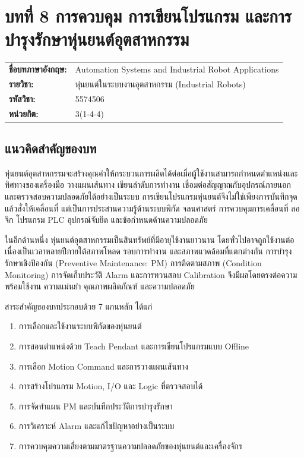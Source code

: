 \section{บทที่ 8 การควบคุม การเขียนโปรแกรม และการบำรุงรักษาหุ่นยนต์อุตสาหกรรม}

\begin{tabularx}{\textwidth}{@{}L{0.24\textwidth}Y@{}}
\textbf{ชื่อบทภาษาอังกฤษ:} & Automation Systems and Industrial Robot Applications \\
\textbf{รายวิชา:} & หุ่นยนต์ในระบบงานอุตสาหกรรม (Industrial Robots) \\
\textbf{รหัสวิชา:} & 5574506 \\
\textbf{หน่วยกิต:} & 3(1-4-4) \\
\end{tabularx}


\subsection{แนวคิดสำคัญของบท}

หุ่นยนต์อุตสาหกรรมจะสร้างคุณค่าให้กระบวนการผลิตได้ต่อเมื่อผู้ใช้งานสามารถกำหนดตำแหน่งและทิศทางของเครื่องมือ วางแผนเส้นทาง เขียนลำดับการทำงาน เชื่อมต่อสัญญาณกับอุปกรณ์ภายนอก และตรวจสอบความปลอดภัยได้อย่างเป็นระบบ การเขียนโปรแกรมหุ่นยนต์จึงไม่ใช่เพียงการบันทึกจุดแล้วสั่งให้เคลื่อนที่ แต่เป็นการประสานความรู้ด้านระบบพิกัด จลนศาสตร์ การควบคุมการเคลื่อนที่ ลอจิก โปรแกรม PLC อุปกรณ์จับยึด และข้อกำหนดด้านความปลอดภัย

ในอีกด้านหนึ่ง หุ่นยนต์อุตสาหกรรมเป็นสินทรัพย์ที่มีอายุใช้งานยาวนาน โดยทั่วไปอาจถูกใช้งานต่อเนื่องเป็นเวลาหลายปีภายใต้สภาพโหลด รอบการทำงาน และสภาพแวดล้อมที่แตกต่างกัน การบำรุงรักษาเชิงป้องกัน (Preventive Maintenance: PM) การติดตามสภาพ (Condition Monitoring) การจัดเก็บประวัติ Alarm และการทวนสอบ Calibration จึงมีผลโดยตรงต่อความพร้อมใช้งาน ความแม่นยำ คุณภาพผลิตภัณฑ์ และความปลอดภัย

สาระสำคัญของบทประกอบด้วย 7 แกนหลัก ได้แก่

\begin{enumerate}
    \item การเลือกและใช้งานระบบพิกัดของหุ่นยนต์
    \item การสอนตำแหน่งด้วย Teach Pendant และการเขียนโปรแกรมแบบ Offline
    \item การเลือก Motion Command และการวางแผนเส้นทาง
    \item การสร้างโปรแกรม Motion, I/O และ Logic ที่ตรวจสอบได้
    \item การจัดทำแผน PM และบันทึกประวัติการบำรุงรักษา
    \item การวิเคราะห์ Alarm และแก้ไขปัญหาอย่างเป็นระบบ
    \item การควบคุมความเสี่ยงตามมาตรฐานความปลอดภัยของหุ่นยนต์และเครื่องจักร
\end{enumerate}

